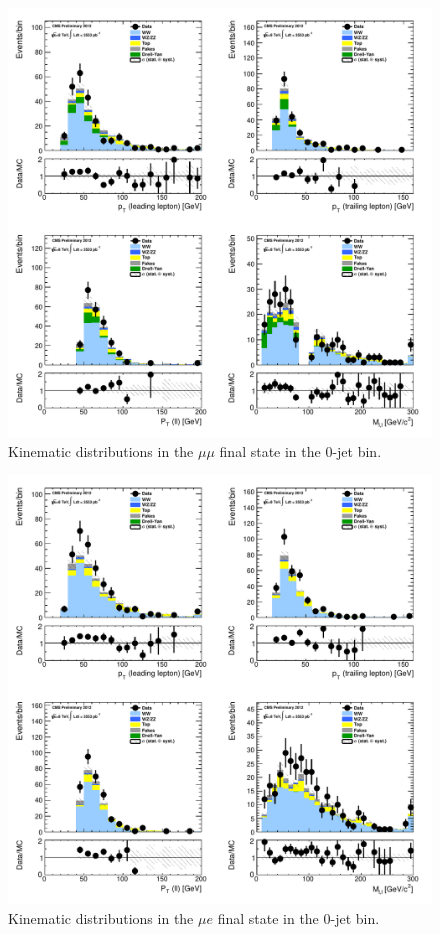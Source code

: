 \begin{figure}[!hbtp]
\centering
\includegraphics[width=1\textwidth]{figures/ww_analysis20_0_ALL_mm_0j.pdf} %
\caption{Kinematic distributions in the $\mu\mu$ final state in the 0-jet bin.}
\label{fig:xs_kinematics_mm_0j}
\end{figure}
\begin{figure}[!hbtp]
\centering
\includegraphics[width=1\textwidth]{figures/ww_analysis20_0_ALL_me_0j.pdf} %
\caption{Kinematic distributions in the $\mu e$ final state in the 0-jet bin.}
\label{fig:xs_kinematics_me_0j}
\end{figure}
